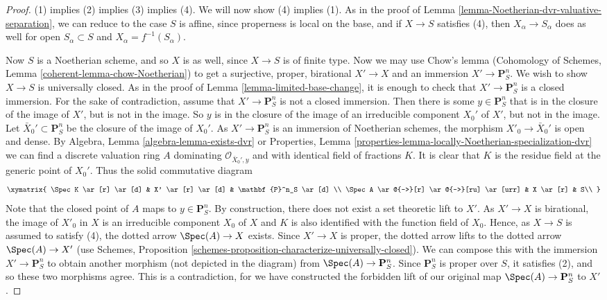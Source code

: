 \begin{proof}
(1) implies (2) implies (3) implies (4).  We will now show (4) implies
(1).  As in the proof of Lemma \ref{lemma-Noetherian-dvr-valuative-separation},
we can reduce to the
case $S$ is affine, since properness is local on the base, and if $X
\to S$ satisfies (4), then $X_\alpha \to S_\alpha$ does as well for
open $S_\alpha \subset S$ and $X_\alpha = f^{-1}(S_\alpha)$.

\medskip\noindent
Now $S$ is a Noetherian scheme, and so $X$ is as well, since $X \to
S$ is of finite type.  Now we may use Chow's lemma
(Cohomology of Schemes, Lemma \ref{coherent-lemma-chow-Noetherian})
to get a surjective, proper, birational
$X' \to X$ and an immersion $X' \to \mathbf{P}^n_S$.  We wish to
show $X \to S$ is universally closed.  As in the proof of Lemma
\ref{lemma-limited-base-change}, it is enough to check that
$X' \to \mathbf{P}^n_S$ is a closed immersion.
For the sake of contradiction, assume that $X' \to
\mathbf{P}^n_S$ is not a closed immersion.  Then there is some $y
\in \mathbf{P}^n_S$ that is in the closure of the image of $X'$, but
is not in the image.  So $y$ is in the closure of the image of an
irreducible component $X_0'$ of $X'$, but not in the image.
Let $\bar X_0' \subset \mathbf{P}^n_S$ be the closure of
the image of $X_0'$. As $X' \to \mathbf{P}^n_S$ is an immersion
of Noetherian schemes, the morphism $X'_0 \to \bar X_0'$ is
open and dense. By
Algebra, Lemma \ref{algebra-lemma-exists-dvr}
or
Properties, Lemma \ref{properties-lemma-locally-Noetherian-specialization-dvr}
we can find a discrete valuation ring $A$ dominating
$\mathcal{O}_{\bar X_0', y}$ and with identical field
of fractions $K$. It is clear that
$K$ is the residue field at the generic point of $X_0'$.
Thus the solid commutative diagram
\begin{equation}
\label{equation-solid}
\xymatrix{
\Spec K \ar[r] \ar[d] & X' \ar [r] \ar[d] &
\mathbf{P}^n_S \ar[d] \\
\Spec A \ar@{-->}[r] \ar@{-->}[ru] \ar[urr] & X \ar[r] & S\\
}
\end{equation}
Note that the closed point of $A$ maps to $y \in \mathbf{P}^n_S$.  By
construction, there does not exist a set theoretic lift to $X'$.
As $X' \to X$ is birational, the image of $X'_0$ in $X$ is an
irreducible component $X_0$ of $X$ and $K$ is also identified with
the function field of $X_0$. Hence, as $X \to S$ is assumed to satisfy (4),
the dotted arrow $\Spec(A) \to X$ exists.
Since $X' \to X$ is proper, the dotted
arrow lifts to the dotted arrow $\Spec(A) \to X'$ (use Schemes,
Proposition \ref{schemes-proposition-characterize-universally-closed}).
We can compose this with the immersion $X' \to \mathbf{P}^n_S$ to obtain
another morphism (not depicted in the diagram) from
$\Spec(A) \to \mathbf{P}^n_S$.  Since $\mathbf{P}^n_S$
is proper over $S$, it satisfies (2), and so these two morphisms
agree.  This is a contradiction, for we have constructed the
forbidden lift of our original map $\Spec(A) \to \mathbf{P}^n_S$
to $X'$.
\end{proof}


